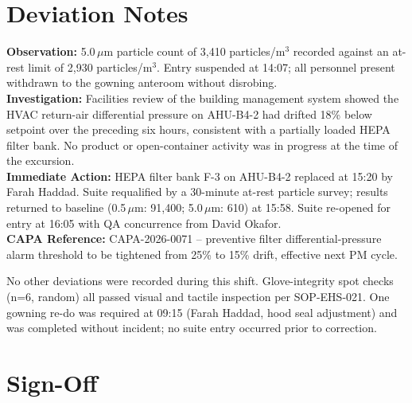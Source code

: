 \section*{Deviation Notes}

\begin{tcolorbox}[colback=panelgray,colframe=ruleline,boxrule=0.6pt,arc=2pt,
  title={DEV-2026-0148 -- Particle Count Excursion, Suite B4, 14:00},
  fonttitle=\bfseries,colbacktitle=steelgray,coltitle=white]
\textbf{Observation:} 5.0\,$\mu$m particle count of 3{,}410 particles/m$^3$ recorded against
an at-rest limit of 2{,}930 particles/m$^3$. Entry suspended at 14:07; all personnel present
withdrawn to the gowning anteroom without disrobing.\\[4pt]
\textbf{Investigation:} Facilities review of the building management system showed the
HVAC return-air differential pressure on AHU-B4-2 had drifted 18\% below setpoint over the
preceding six hours, consistent with a partially loaded HEPA filter bank. No product or
open-container activity was in progress at the time of the excursion.\\[4pt]
\textbf{Immediate Action:} HEPA filter bank F-3 on AHU-B4-2 replaced at 15:20 by Farah
Haddad. Suite requalified by a 30-minute at-rest particle survey; results returned to
baseline (0.5\,$\mu$m: 91{,}400; 5.0\,$\mu$m: 610) at 15:58. Suite re-opened for entry at
16:05 with QA concurrence from David Okafor.\\[4pt]
\textbf{CAPA Reference:} CAPA-2026-0071 -- preventive filter differential-pressure alarm
threshold to be tightened from 25\% to 15\% drift, effective next PM cycle.
\end{tcolorbox}

\begin{tcolorbox}[colback=white,colframe=ruleline,boxrule=0.6pt,arc=2pt,
  title={General Notes}, fonttitle=\bfseries,colbacktitle=steelgray,coltitle=white]
No other deviations were recorded during this shift. Glove-integrity spot checks (n=6,
random) all passed visual and tactile inspection per SOP-EHS-021. One gowning re-do was
required at 09:15 (Farah Haddad, hood seal adjustment) and was completed without incident;
no suite entry occurred prior to correction.
\end{tcolorbox}

\section*{Sign-Off}

